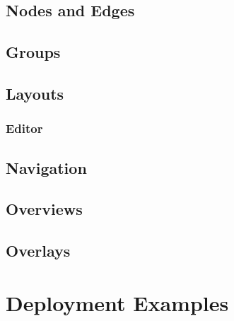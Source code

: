\documentclass[11pt, a4paper]{article}
\begin{document}
\subsection{Nodes and Edges}
\label{sec:nodes-and-edges}

\subsection{Groups}
\label{sec:groups}

\subsection{Layouts}
\label{sec:layouts}


\subsubsection{Editor}
\label{sec:editor}

\subsection{Navigation}
\label{sec:navigation}
  

\subsection{Overviews}
\label{sec:overviews}

\subsection{Overlays}
\label{sec:overlays}

\section{Deployment Examples}
\label{sec:deployment-examples}
\end{document}
